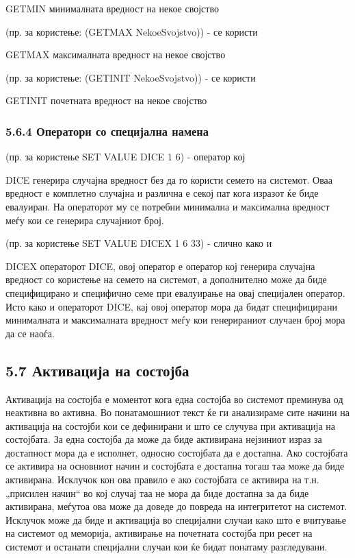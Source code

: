 GETMIN минималната вредност на некое својство

(пр. за користење: (GETMAX NekoeSvojstvo)) - се користи

GETMAX максималната вредност на некое својство

(пр. за користење: (GETINIT NekoeSvojstvo)) - се користи

GETINIT почетната вредност на некое својство

\subsubsection{5.6.4 Оператори со специјална намена}

(пр. за користење SET VALUE DICE 1 6) - оператор кој

DICE генерира случајна вредност без да го користи семето на системот. Оваа вредност е комплетно случајна и различна е секој пат кога изразот ќе биде евалуиран. На операторот му се потребни минимална и максимална вредност меѓу кои се генерира случајниот број.

(пр. за користење SET VALUE DICEX 1 6 33) - слично како и

DICEX операторот DICE, овој оператор е оператор кој генерира случајна вредност со користење на семето на системот, а дополнително може да биде специфицирано и специфично семе при евалуирање на овај специјален оператор. Исто како и операторот DICE, кај овој оператор мора да бидат специфицирани минималната и максималната вредност меѓу кои генерираниот случаен број мора да се наоѓа.

\subsection{5.7 Активација на состојба}

Активација на состојба е моментот кога една состојба во системот преминува од неактивна во активна. Во понатамошниот текст ќе ги анализираме сите начини на активација на состојби кои се дефинирани и што се случува при активација на состојбата. За една состојба да може да биде активирана нејзиниот израз за достапност мора да е исполнет, односно состојбата да е достапна. Ако состојбата се активира на основниот начин и состојбата е достапна тогаш таа може да биде активирана. Исклучок кон ова правило е ако состојбата се активира на т.н. „присилен начин“ во кој случај таа не мора да биде достапна за да биде активирана, меѓутоа ова може да доведе до повреда на интегритетот на системот. Исклучок може да биде и активација во специјални случаи како што е вчитување на системот од меморија, активирање на почетната состојба при ресет на системот и останати специјални случаи кои ќе бидат понатаму разгледувани.

